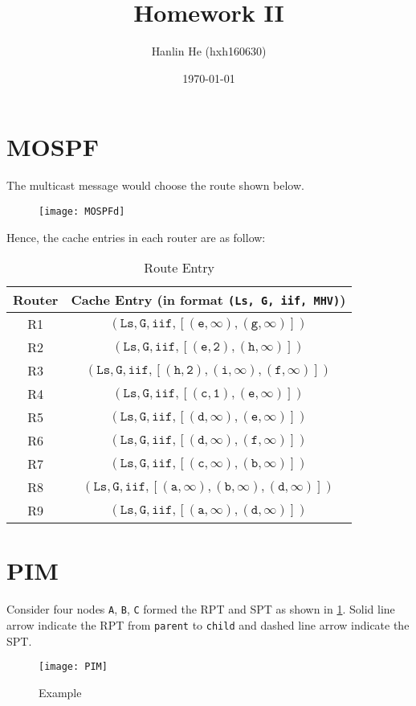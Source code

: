 \documentclass[12pt,titlepage,letterpaper]{article}
\title{Homework II}
\author{Hanlin He (hxh160630)}
\date{\today}
\begin{document}
\maketitle

\section{MOSPF}
The multicast message would choose the route shown below.
\begin{figure}[H]
\centering
\texttt{[image: MOSPFd]}
\end{figure}

Hence, the cache entries in each router are as follow:

\begin{table}[H]
\centering
\caption{Route Entry}
\begin{tabular}{c|c}
    \hline
    \textbf{Router} & \textbf{Cache Entry} (in format \texttt{(Ls, G, iif, MHV)}) \\\hline
    R1 & $\mathtt{(Ls, G, iif, [(e,\infty), (g,\infty)])}$ \\
    R2 & $\mathtt{(Ls, G, iif, [(e,2), (h,\infty)])}$ \\
    R3 & $\mathtt{(Ls, G, iif, [(h,2), (i,\infty), (f,\infty)])}$ \\
    R4 & $\mathtt{(Ls, G, iif, [(c,1), (e,\infty)])}$ \\
    R5 & $\mathtt{(Ls, G, iif, [(d,\infty), (e,\infty)])}$ \\
    R6 & $\mathtt{(Ls, G, iif, [(d,\infty), (f,\infty)])}$ \\
    R7 & $\mathtt{(Ls, G, iif, [(c,\infty), (b,\infty)])}$ \\
    R8 & $\mathtt{(Ls, G, iif, [(a,\infty), (b,\infty), (d,\infty)])}$ \\
    R9 & $\mathtt{(Ls, G, iif, [(a,\infty), (d,\infty)])}$ \\\hline
\end{tabular}
\end{table}

\section{PIM}

Consider four nodes \texttt{A}, \texttt{B}, \texttt{C} formed the RPT and SPT
as shown in \cref{pim}. Solid line arrow indicate the RPT from \texttt{parent}
to \texttt{child} and dashed line arrow indicate the SPT.

\begin{figure}[H]
\caption{Example}\label{pim}
\centering
\texttt{[image: PIM]}
\end{figure}
\end{document}
